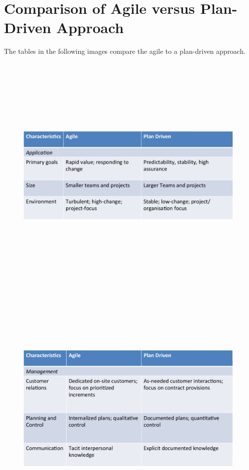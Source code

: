 \documentclass[a4paper]{report}
\begin{document}
\section{Comparison of Agile versus Plan-Driven Approach}
The tables in the following images compare the agile to a plan-driven approach. 
\begin{figure}[h]
\begin{center} 
    \includegraphics[scale=0.8,width = 15cm, height = 12cm]{images/AgileTable1.pdf}
\end{center}
\end{figure}

\begin{figure}[h]
\begin{center} 
    \includegraphics[scale=0.8,width = 15cm, height = 12cm]{images/AgileTable2.pdf}
\end{center}
\end{figure}
\end{document}
